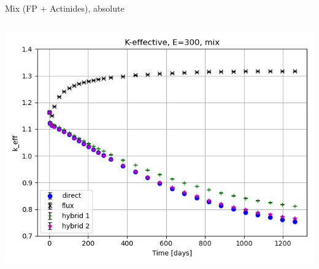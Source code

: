 \documentclass[
	11pt, %
	aspectratio=169, %
]{beamer}
\begin{document}
\begin{frame}{Mix (FP + Actinides), absolute}
	\begin{columns}[c] %
		\begin{column}{0.39\textwidth}
			\includegraphics[width=\textwidth]{../figures/keff/keff_mix_300.png}


\end{column}
\end{columns}
\end{frame}
\end{document}
